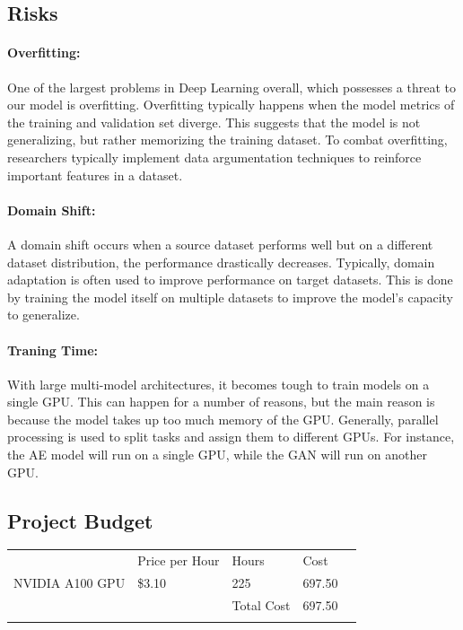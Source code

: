 \documentclass{article}
\begin{document}
\subsection{Risks}
\paragraph{Overfitting:}
One of the largest problems in Deep Learning overall, which possesses a threat to our model is overfitting. Overfitting typically happens when the model metrics of the training and validation set diverge. This suggests that the model is not generalizing, but rather memorizing the training dataset. To combat overfitting, researchers typically implement data argumentation techniques to reinforce important features in a dataset. 

\paragraph{Domain Shift:}
A domain shift occurs when a source dataset performs well but on a different dataset distribution, the performance drastically decreases. Typically, domain adaptation is often used to improve performance on target datasets. This is done by training the model itself on multiple datasets to improve the model's capacity to generalize.

\paragraph{Traning Time:}
With large multi-model architectures, it becomes tough to train models on a single GPU. This can happen for a number of reasons, but the main reason is because the model takes up too much memory of the GPU. Generally, parallel processing is used to split tasks and assign them to different GPUs. For instance, the AE model will run on a single GPU, while the GAN will run on another GPU.

\subsection{Project Budget}
\begin{tabular}{lllll}
                & Price per Hour & Hours      & Cost   &  \\
NVIDIA A100 GPU & \$3.10         & 225        & 697.50 &  \\
                &                & Total Cost & 697.50 &  \\
                &                &            &        & 
\end{tabular}
\end{document}
